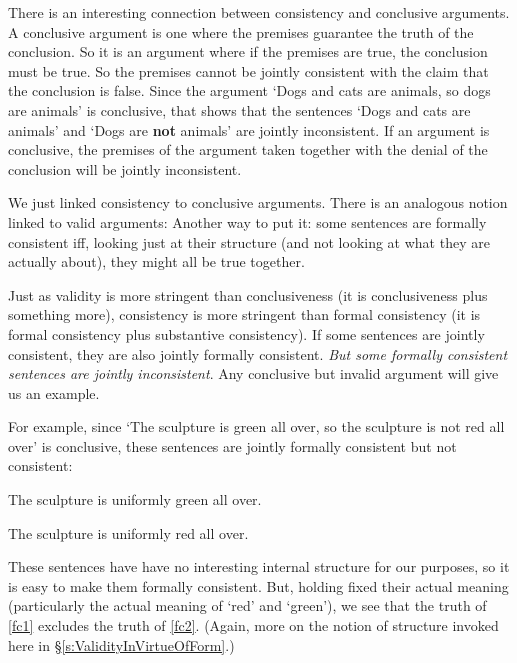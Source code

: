 There is an interesting connection between consistency and conclusive arguments. A conclusive argument is one where the premises guarantee the truth of the conclusion. So it is an argument where if the premises are true, the conclusion must be true. So the premises cannot be jointly consistent with the claim that the conclusion is false. Since the argument `Dogs and cats are animals, so dogs are animals' is conclusive, that shows that the sentences `Dogs and cats are animals' and `Dogs are \textbf{not} animals' are jointly inconsistent. If an argument is conclusive, the premises of the argument taken together with the denial of the conclusion will be jointly inconsistent.

We just linked consistency to conclusive arguments. There is an analogous notion linked to valid arguments: 
Another way to put it: some sentences are formally consistent iff, looking just at their structure (and not looking at what they are actually about), they might all be true together.

Just as validity is more stringent than conclusiveness (it is conclusiveness plus something more), consistency is more stringent than formal consistency (it is formal consistency plus substantive consistency). If some sentences are jointly consistent, they are also jointly formally consistent. \emph{But some formally consistent sentences are jointly inconsistent}. Any conclusive but invalid argument will give us an example. 

For example, since `The sculpture is green all over, so the sculpture is not red all over' is conclusive, these sentences are jointly formally consistent but not consistent: \begin{earg}
	\item[\ex{fc1}] The sculpture is uniformly green all over.
	\item[\ex{fc2}] The sculpture is uniformly red all over.
\end{earg}
These sentences have have no interesting internal structure for our purposes, so it is easy to make them formally consistent. But, holding fixed their actual meaning (particularly the actual meaning of `red' and `green'), we see that the truth of \ref{fc1} excludes the truth of \ref{fc2}. (Again, more on the notion of structure invoked here in §\ref{s:ValidityInVirtueOfForm}.)

